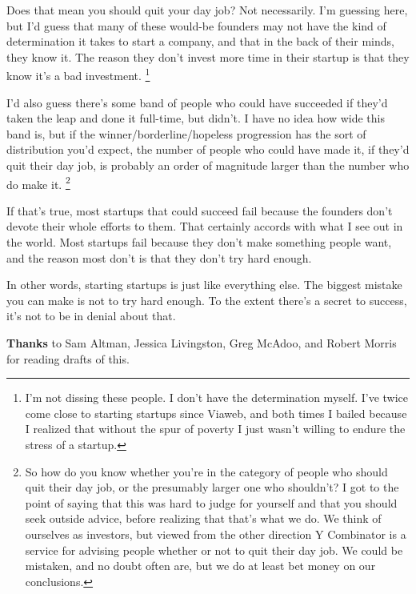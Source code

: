 Does that mean you should quit your day job? Not necessarily. I'm
guessing here, but I'd guess that many of these would-be founders may
not have the kind of determination it takes to start a company, and that
in the back of their minds, they know it. The reason they don't invest
more time in their startup is that they know it's a bad investment.
\footnote{I'm not dissing these people. I don't have the determination
myself. I've twice come close to starting startups since Viaweb, and
both times I bailed because I realized that without the spur of poverty
I just wasn't willing to endure the stress of a startup.}

I'd also guess there's some band of people who could have succeeded if
they'd taken the leap and done it full-time, but didn't. I have no idea
how wide this band is, but if the winner/borderline/hopeless progression
has the sort of distribution you'd expect, the number of people who
could have made it, if they'd quit their day job, is probably an order
of magnitude larger than the number who do make it.
\footnote{So how do you know whether you're in the category of people who
should quit their day job, or the presumably larger one who shouldn't? I
got to the point of saying that this was hard to judge for yourself and
that you should seek outside advice, before realizing that that's what
we do. We think of ourselves as investors, but viewed from the other
direction Y Combinator is a service for advising people whether or not
to quit their day job. We could be mistaken, and no doubt often are, but
we do at least bet money on our conclusions.}

If that's true, most startups that could succeed fail because the
founders don't devote their whole efforts to them. That certainly
accords with what I see out in the world. Most startups fail because
they don't make something people want, and the reason most don't is that
they don't try hard enough.

In other words, starting startups is just like everything else. The
biggest mistake you can make is not to try hard enough. To the extent
there's a secret to success, it's not to be in denial about that.


\textbf{Thanks} to Sam Altman, Jessica Livingston, Greg McAdoo, and
Robert Morris for reading drafts of this.